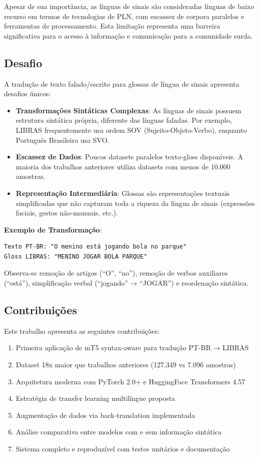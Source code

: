 \documentclass[12pt]{article}
\begin{document}
Apesar de sua importância, as línguas de sinais são consideradas línguas de baixo recurso em termos de tecnologias de PLN, com escassez de corpora paralelos e ferramentas de processamento. Esta limitação representa uma barreira significativa para o acesso à informação e comunicação para a comunidade surda.

\subsection{Desafio}

A tradução de texto falado/escrito para glossas de língua de sinais apresenta desafios únicos:

\begin{itemize}
\item \textbf{Transformações Sintáticas Complexas}: As línguas de sinais possuem estrutura sintática própria, diferente das línguas faladas. Por exemplo, LIBRAS frequentemente usa ordem SOV (Sujeito-Objeto-Verbo), enquanto Português Brasileiro usa SVO.
\item \textbf{Escassez de Dados}: Poucos datasets paralelos texto-gloss disponíveis. A maioria dos trabalhos anteriores utiliza datasets com menos de 10.000 amostras.
\item \textbf{Representação Intermediária}: Glossas são representações textuais simplificadas que não capturam toda a riqueza da língua de sinais (expressões faciais, gestos não-manuais, etc.).
\end{itemize}

\textbf{Exemplo de Transformação}:
\begin{verbatim}
Texto PT-BR: "O menino está jogando bola no parque"
Gloss LIBRAS: "MENINO JOGAR BOLA PARQUE"
\end{verbatim}

Observa-se remoção de artigos (``O'', ``no''), remoção de verbos auxiliares (``está''), simplificação verbal (``jogando'' → ``JOGAR'') e reordenação sintática.

\subsection{Contribuições}

Este trabalho apresenta as seguintes contribuições:

\begin{enumerate}
\item Primeira aplicação de mT5 syntax-aware para tradução PT-BR → LIBRAS
\item Dataset 18x maior que trabalhos anteriores (127.349 vs 7.096 amostras)
\item Arquitetura moderna com PyTorch 2.0+ e HuggingFace Transformers 4.57
\item Estratégia de transfer learning multilíngue proposta
\item Augmentação de dados via back-translation implementada
\item Análise comparativa entre modelos com e sem informação sintática
\item Sistema completo e reproduzível com testes unitários e documentação
\end{enumerate}
\end{document}
